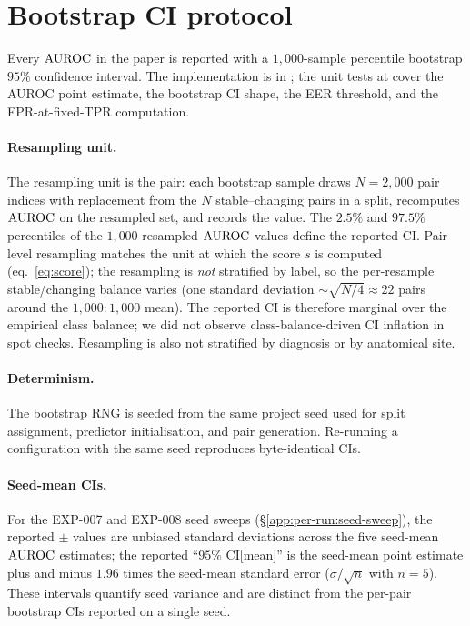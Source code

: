 \section{Bootstrap CI protocol}
\label{app:bootstrap-protocol}

Every $\mathrm{AUROC}$ in the paper is reported with a $1{,}000$-sample
percentile bootstrap $95\%$ confidence interval. The implementation is
 in ; the
unit tests at  cover the AUROC point
estimate, the bootstrap CI shape, the EER threshold, and the
FPR-at-fixed-TPR computation.

\paragraph{Resampling unit.} The resampling unit is the pair: each
bootstrap sample draws $N = 2{,}000$ pair indices with replacement from
the $N$ stable--changing pairs in a split, recomputes $\mathrm{AUROC}$ on the
resampled set, and records the value. The $2.5\%$ and $97.5\%$
percentiles of the $1{,}000$ resampled $\mathrm{AUROC}$ values define the
reported CI. Pair-level resampling matches the unit at which the score
$s$ is computed (eq.~\ref{eq:score}); the resampling is
\emph{not} stratified by label, so the per-resample stable/changing
balance varies (one standard deviation $\sim$$\sqrt{N/4} \approx 22$
pairs around the $1{,}000{:}1{,}000$ mean). The reported CI is
therefore marginal over the empirical class balance; we did not
observe class-balance-driven CI inflation in spot checks.
Resampling is also not stratified by diagnosis or by anatomical site.

\paragraph{Determinism.} The bootstrap RNG is seeded from the same
project seed used for split assignment, predictor initialisation, and
pair generation. Re-running a configuration with the same seed
reproduces byte-identical CIs.

\paragraph{Seed-mean CIs.} For the EXP-007 and EXP-008 seed sweeps
(\S\ref{app:per-run:seed-sweep}), the reported $\pm$ values are
unbiased standard deviations across the five seed-mean $\mathrm{AUROC}$
estimates; the reported ``$95\%$ CI[mean]'' is the seed-mean point
estimate plus and minus $1.96$ times the seed-mean standard error
($\sigma / \sqrt{n}$ with $n = 5$). These intervals quantify seed
variance and are distinct from the per-pair bootstrap CIs reported on a
single seed.

